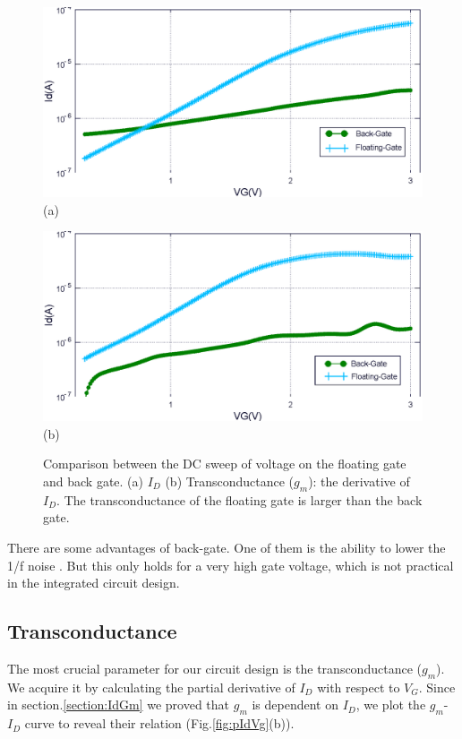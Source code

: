 \begin{figure}[tbp]
    \centering
    \begin{minipage}[t]{1\textwidth}
        \centering
        \includegraphics[width=1\textwidth]{images/chapter3/FgBg_Compare_Id.eps}
        \raggedleft
        (a)
    \end{minipage}
    \vfill
    \begin{minipage}[t]{1\textwidth}
        \centering
        \includegraphics[width=1\textwidth]{images/chapter3/FgBg_Compare_Id_dev.eps}
        \raggedleft
        (b)
    \end{minipage}
    \caption{Comparison between the DC sweep of voltage on the floating gate and back gate. (a) $I_D$ (b) Transconductance ($g_m$): the derivative of $I_D$. The transconductance of the floating gate is larger than the back gate.}
    \label{fig:IdVgandgbsId}
\end{figure}


There are some advantages of back-gate.
One of them is the ability to lower the 1/f noise \cite{C7, C8}.
But this only holds for a very high gate voltage, which is not practical in the integrated circuit design.

\subsection{Transconductance}
The most crucial parameter for our circuit design is the transconductance ($g_m$).
We acquire it by calculating the partial derivative of $I_D$ with respect to $V_{G}$.
Since in section.\ref{section:IdGm} we proved that $g_m$ is dependent on $I_D$, we plot the $g_m$-$I_D$ curve to reveal their relation (Fig.\ref{fig:pIdVg}(b)).

